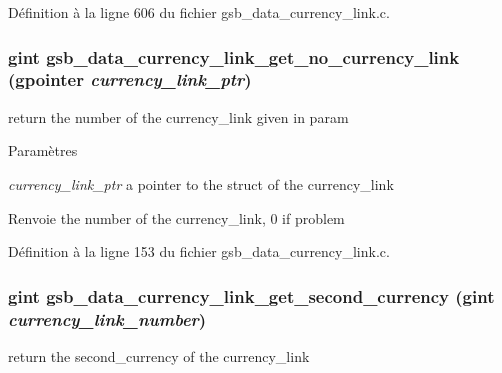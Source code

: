 Définition à la ligne 606 du fichier gsb\_\-data\_\-currency\_\-link.c.

\subsubsection[{gsb\_\-data\_\-currency\_\-link\_\-get\_\-no\_\-currency\_\-link}]{\setlength{\rightskip}{0pt plus 5cm}gint gsb\_\-data\_\-currency\_\-link\_\-get\_\-no\_\-currency\_\-link (gpointer {\em currency\_\-link\_\-ptr})}\label{gsb__data__currency__link_8c_a98649f0d33b433e86464d1446d72736e}
return the number of the currency\_\-link given in param


\begin{DoxyParams}{Paramètres}
\item[{\em currency\_\-link\_\-ptr}]a pointer to the struct of the currency\_\-link\end{DoxyParams}
\begin{DoxyReturn}{Renvoie}
the number of the currency\_\-link, 0 if problem 
\end{DoxyReturn}


Définition à la ligne 153 du fichier gsb\_\-data\_\-currency\_\-link.c.

\subsubsection[{gsb\_\-data\_\-currency\_\-link\_\-get\_\-second\_\-currency}]{\setlength{\rightskip}{0pt plus 5cm}gint gsb\_\-data\_\-currency\_\-link\_\-get\_\-second\_\-currency (gint {\em currency\_\-link\_\-number})}\label{gsb__data__currency__link_8c_a7b5878d793377c0cd6cb5c140f7dc56d}
return the second\_\-currency of the currency\_\-link


